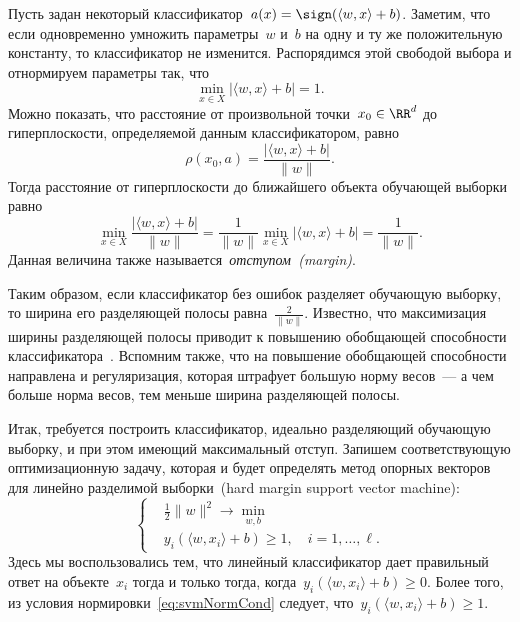 \documentclass[12pt,fleqn]{article}
\begin{document}
Пусть задан некоторый классификатор~$a(x) = \sign (\langle w, x \rangle + b)$.
Заметим, что если одновременно умножить параметры~$w$ и~$b$
на одну и ту же положительную константу,
то классификатор не изменится.
Распорядимся этой свободой выбора и отнормируем параметры так, что
\begin{equation}
\label{eq:svmNormCond}
    \min_{x \in X} | \langle w, x \rangle + b| = 1.
\end{equation}
Можно показать, что расстояние от произвольной точки~$x_0 \in \RR^d$ до гиперплоскости,
определяемой данным классификатором, равно
\[
    \rho(x_0, a)
    =
    \frac{
        |\langle w, x \rangle + b|
    }{
        \|w\|
    }.
\]
Тогда расстояние от гиперплоскости до ближайшего объекта обучающей выборки равно
\[
    \min_{x \in X}
    \frac{
        |\langle w, x \rangle + b|
    }{
        \|w\|
    }
    =
    \frac{1}{\|w\|} \min_{x \in X} |\langle w, x \rangle + b|
    =
    \frac{1}{\|w\|}.
\]
Данная величина также называется~\emph{отступом~(margin)}.

Таким образом, если классификатор без ошибок разделяет обучающую выборку,
то ширина его разделяющей полосы равна~$\frac{2}{\|w\|}$.
Известно, что максимизация ширины разделяющей полосы приводит
к повышению обобщающей способности классификатора~\cite{mohri12foundations}.
Вспомним также, что на повышение обобщающей способности направлена и регуляризация,
которая штрафует большую норму весов~--- а чем больше норма весов,
тем меньше ширина разделяющей полосы.

Итак, требуется построить классификатор, идеально разделяющий обучающую выборку,
и при этом имеющий максимальный отступ.
Запишем соответствующую оптимизационную задачу,
которая и будет определять метод опорных векторов для линейно разделимой выборки~(hard margin support vector machine):
\begin{equation}
\label{eq:svmSep}
    \left\{
        \begin{aligned}
            & \frac{1}{2} \|w\|^2 \to \min_{w, b} \\
            & y_i \left(
                \langle w, x_i \rangle + b
            \right) \geq 1, \quad i = 1, \dots, \ell.
        \end{aligned}
    \right.
\end{equation}
Здесь мы воспользовались тем, что линейный классификатор дает правильный ответ
на объекте~$x_i$ тогда и только тогда, когда~$y_i (\langle w, x_i \rangle + b) \geq 0$.
Более того, из условия нормировки~\eqref{eq:svmNormCond} следует,
что~$y_i (\langle w, x_i \rangle + b) \geq 1$.
\end{document}
